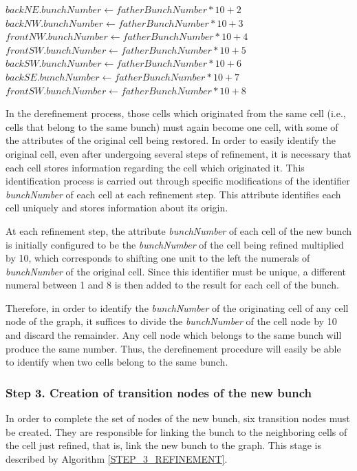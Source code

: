 \begin{algorithm}[!h]
{\begin{algorithmic}[1]
        \State
        \State $backNE.bunchNumber \gets fatherBunchNumber*10 + 2$
        \State $backNW.bunchNumber \gets fatherBunchNumber*10 + 3$
        \State $frontNW.bunchNumber \gets fatherBunchNumber*10 + 4$
        \State $frontSW.bunchNumber \gets fatherBunchNumber*10 + 5$
        \State $backSW.bunchNumber \gets fatherBunchNumber*10 + 6$
        \State $backSE.bunchNumber \gets fatherBunchNumber*10 + 7$
        \State $frontSW.bunchNumber \gets fatherBunchNumber*10 + 8$
    \end{algorithmic}
    }
    \label{STEP_2_REFINEMENT}
\end{algorithm}

In the derefinement process, those cells which originated from the
same cell (i.e., cells that belong to the same bunch) must again
become one cell, with some of the attributes of the original cell
being restored. In order to easily identify the original cell, even
after undergoing several steps of refinement, it is necessary that
each cell stores information regarding the cell which originated it.
This identification process is carried out through specific
modifications of the identifier \textit{bunchNumber} of each cell at
each refinement step. This attribute identifies each cell uniquely
and stores information about its origin.

At each refinement step, the attribute \textit{bunchNumber} of each
cell of the new bunch is initially configured to be the
\textit{bunchNumber} of the cell being refined multiplied by 10,
which corresponds to shifting one unit to the left the numerals of
\textit{bunchNumber} of the original cell. Since this identifier
must be unique, a different numeral between 1 and 8 is then added to
the result for each cell of the bunch.

Therefore, in order to identify the \textit{bunchNumber} of the
originating cell of any cell node of the graph, it suffices to
divide the \textit{bunchNumber} of the cell node by 10 and discard
the remainder. Any cell node which belongs to the same bunch will
produce the same number. Thus, the derefinement procedure will
easily be able to identify when two cells belong to the same bunch.


\subsubsection*{Step 3. Creation of transition nodes of the new bunch}
In order to complete the set of nodes of the new bunch, six
transition nodes must be created. They are responsible for linking
the bunch to the neighboring cells of the cell just refined, that
is, link the new bunch to the graph. This stage is described by
Algorithm \ref{STEP_3_REFINEMENT}.

